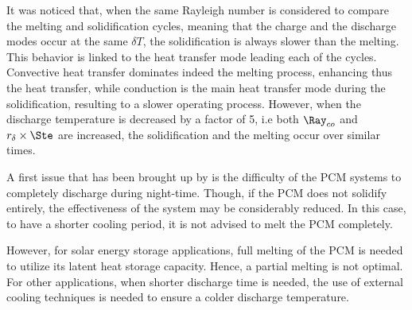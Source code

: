 It was noticed that, when the same Rayleigh number is considered to compare the melting and solidification cycles, meaning that the charge and the discharge modes occur at the same $\delta T$, the solidification is always slower than the melting. 
This behavior is linked to the heat transfer mode leading each of the cycles. 
Convective heat transfer dominates indeed the melting process, enhancing thus the heat transfer, while conduction is the main heat transfer mode during the solidification, resulting to a slower operating process.
However, when the discharge temperature is decreased by a factor of 5, i.e both $\Ray_{co}$ and $r_{\delta} \times \Ste$ are increased, the solidification and the melting occur over similar times.

A first issue that has been brought up by \cite{ascione2014energy} is the difficulty of the PCM systems to completely discharge during night-time.
Though, if the PCM does not solidify entirely, the effectiveness of the system may be considerably reduced.
In this case, to have a shorter cooling period, it is not advised to melt the PCM completely.

However, for solar energy storage applications, full melting of the PCM is needed to utilize its latent heat storage capacity.
Hence, a partial melting is not optimal.  For other applications, when shorter discharge time is needed, the use of external cooling techniques is needed to ensure a colder discharge temperature.
